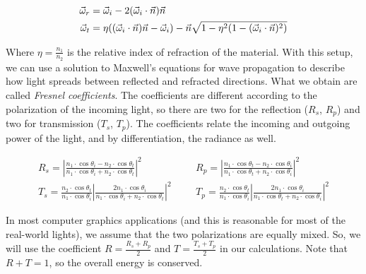 \begin{equation*}
\begin{split}
\vec{\omega}_r &= \vec{\omega}_i - 2 (\vec{\omega}_i \cdot \vec{n}) \vec{n} \\
\vec{\omega}_t &= \eta ((\vec{\omega}_i \cdot \vec{n}) \vec{n} - \vec{\omega}_i) - \vec{n} \sqrt{1 - \eta^2 (1 - (\vec{\omega}_i \cdot \vec{n}) ^ 2)}
\end{split}
\end{equation*}

Where $\eta = \frac{n_1}{n_2}$ is the relative index of refraction of the material. With this setup, we can use a solution to Maxwell's equations for wave propagation to describe how light spreads between reflected and refracted directions. What we obtain are called \emph{Fresnel coefficients}. The coefficients are different according to the polarization of the incoming light, so there are two for the reflection ($R_s$, $R_p$) and two for transmission ($T_s$, $T_p$). The coefficients relate the incoming and outgoing power of the light, and by differentiation, the radiance as well.

\begin{equation*}
\begin{split}
R_s = \left|\frac{n_1 \cdot \cos\theta_i - n_2 \cdot \cos\theta_t} {n_1 \cdot \cos\theta_i + n_2 \cdot \cos\theta_t}\right|^2 \;\;\;&\;\;\; R_p = \left|\frac{n_1 \cdot \cos\theta_t - n_2 \cdot \cos\theta_i} {n_1 \cdot \cos\theta_t + n_2 \cdot \cos\theta_i}\right|^2\\
T_s = \frac{n_2 \cdot \cos\theta_t}{n_1 \cdot \cos\theta_i} \left|\frac{2 n_1 \cdot \cos\theta_i}{n_1 \cdot \cos\theta_i + n_2 \cdot \cos\theta_t}\right|^2 \;\;\;&\;\;\; T_p = \frac{n_2 \cdot \cos\theta_t}{n_1 \cdot \cos\theta_i}  \left|\frac{2 n_1 \cdot \cos\theta_i}{n_1 \cdot \cos\theta_t + n_2 \cdot \cos\theta_i}\right|^2
\end{split}
\end{equation*}


In most computer graphics applications (and this is reasonable for most of the real-world lights), we assume that the two polarizations are equally mixed. So, we will use the coefficient $R = \frac{R_s + R_p}{2}$ and $T = \frac{T_s + T_p}{2}$ in our calculations. Note that $R + T = 1$, so the overall energy is conserved.


